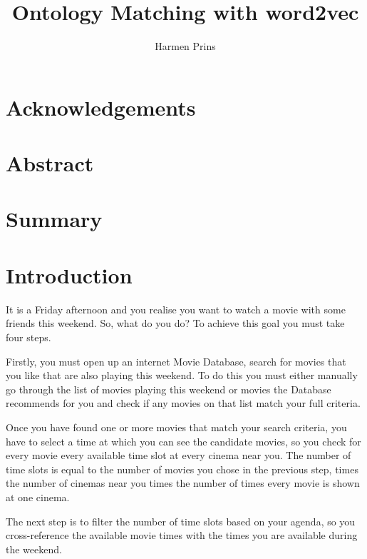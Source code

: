\documentclass{article}
\title{Ontology Matching with word2vec}
\author{Harmen Prins}
\begin{document}
 \maketitle
 \newpage
 
 \section*{Acknowledgements}
 \section*{Abstract}  
 
 \section*{Summary}
 \tableofcontents
 \newpage
 
 
 \section{Introduction} \label{intro}
 It is a Friday afternoon and you realise you want to watch a movie with some friends this weekend. So, what do you do? To achieve this goal you must take four steps.
 
 Firstly, you must open up an internet Movie Database, search for movies that you like that are also playing this weekend. To do this you must either manually go through the list of movies playing this weekend or movies the Database recommends for you and check if any movies on that list match your full criteria.
 
 Once you have found one or more movies that match your search criteria, you have to select a time at which you can see the candidate movies, so you check for every movie every available time slot at every cinema near you. The number of time slots is equal to the number of movies you chose in the previous step, times the number of cinemas near you times the number of times every movie is shown at one cinema.
 
 The next step is to filter the number of time slots based on your agenda, so you cross-reference the available movie times with the times you are available during the weekend.
 
\end{document}
